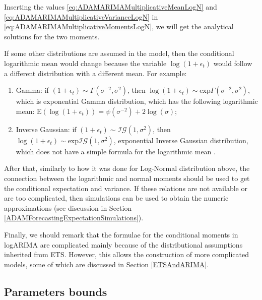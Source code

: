 \documentclass[
]{book}
\providecommand{\tightlist}{%
  \setlength{\itemsep}{0pt}\setlength{\parskip}{0pt}}
\theoremstyle{definition}
\theoremstyle{definition}
\theoremstyle{definition}
\theoremstyle{definition}
\theoremstyle{remark}
\begin{document}
Inserting the values \eqref{eq:ADAMARIMAMultiplicativeMeanLogN} and \eqref{eq:ADAMARIMAMultiplicativeVarianceLogN} in \eqref{eq:ADAMARIMAMultiplicativeMomentsLogN}, we will get the analytical solutions for the two moments.

If some other distributions are assumed in the model, then the conditional logarithmic mean would change because the variable \(\log(1+\epsilon_t)\) would follow a different distribution with a different mean. For example:

\begin{enumerate}
\def\labelenumi{\arabic{enumi}.}
\tightlist
\item
  Gamma: if \(\left(1+\epsilon_t \right) \sim \mathcal{\Gamma}(\sigma^{-2}, \sigma^2)\), then \(\log\left(1+\epsilon_t \right) \sim \mathrm{exp}\mathcal{\Gamma}(\sigma^{-2}, \sigma^2)\), which is exponential Gamma distribution, which has the following logarithmic mean: \(\mathrm{E}(\log(1+\epsilon_t)) = \psi\left(\sigma^{-2}\right)+2\log(\sigma)\);
\item
  Inverse Gaussian: if \(\left(1+\epsilon_t \right) \sim \mathcal{IG}(1, \sigma^2)\), then \(\log\left(1+\epsilon_t \right) \sim \mathrm{exp}\mathcal{IG}(1, \sigma^2)\), exponential Inverse Gaussian distribution, which does not have a simple formula for the logarithmic mean \citep[but it can be calculated based on its connection with Generalised \(\mathcal{IG}\) and formulae provided in][]{Sichel1997}.
\end{enumerate}

After that, similarly to how it was done for Log-Normal distribution above, the connection between the logarithmic and normal moments should be used to get the conditional expectation and variance. If these relations are not available or are too complicated, then simulations can be used to obtain the numeric approximations (see discussion in Section \ref{ADAMForecastingExpectationSimulations}).

Finally, we should remark that the formulae for the conditional moments in logARIMA are complicated mainly because of the distributional assumptions inherited from ETS. However, this allows the construction of more complicated models, some of which are discussed in Section \ref{ETSAndARIMA}.

\hypertarget{parameters-bounds}{%
\subsection{Parameters bounds}\label{parameters-bounds}}
\end{document}
